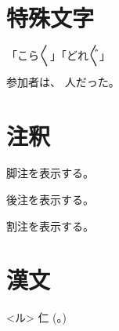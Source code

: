 \documentclass[ %
    uplatex, %
    tate, %
    hanging_punctuation, %
    paper=b6, %
    reference_mark=interlinear, %
    book %
]{jlreq}
\begin{document}
\section{特殊文字}

     
     
     
     

     
     
     
     

     
     
     
     


「こら〳〵」「どれ〴〵」

参加者は、 人だった。


\section{注釈}

脚注を表示する。

後注を表示する。

割注を表示する。


\section{漢文}


<ル>
仁
(。)
\end{document}
